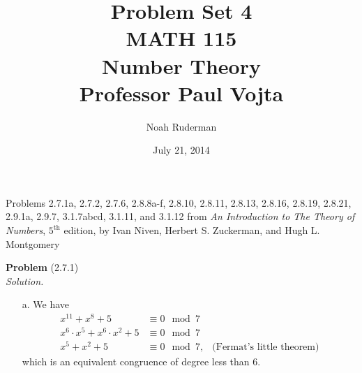 \documentclass[12 pt]{amsart}
\begin{document}
\allowdisplaybreaks
\title
[Problem Set 4]
{Problem Set 4 \\
MATH 115 \\
Number Theory \\
Professor Paul Vojta}

\author{Noah Ruderman}

\date{ July 21, 2014}

\maketitle
\begin{center}
	Problems 2.7.1a, 2.7.2, 2.7.6, 2.8.8a-f, 2.8.10, 2.8.11, 2.8.13, 2.8.16, 2.8.19, 2.8.21, 2.9.1a, 2.9.7, 3.1.7abcd, 3.1.11, and 3.1.12 
	from \emph{An Introduction to The Theory of Numbers}, 
	$5^{\text{th}}$ edition,
	by Ivan Niven, Herbert S. Zuckerman, and Hugh L. Montgomery 
\end{center}

\newpage
\phantom{\quad} \vfill
\noindent
\textbf{Problem} (2.7.1) \\[4ex]
\emph{Solution.} \\[2ex]
	\begin{enumerate}
		\item[a.]
      We have 
      \begin{align*}
        x^{11} + x^8 + 5 &\equiv 0 \mod 7 \\
        x^6 \cdot x^5 + x^6 \cdot x^2 + 5 &\equiv 0 \mod 7 \\
        x^5 + x^2 + 5 &\equiv 0 \mod 7, & \text{(Fermat's little theorem)}
      \end{align*}
      which is an equivalent congruence of degree less than 6. 
	\end{enumerate}
\vfill
\newpage
\end{document}
